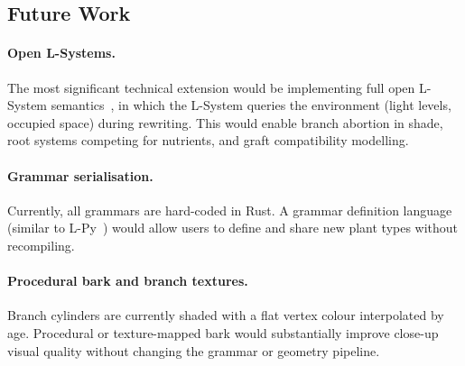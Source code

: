 \subsection{Future Work}

\paragraph{Open L-Systems.}
The most significant technical extension would be implementing full open L-System
semantics~\cite{mechVisualModelsPlants1996}, in which the L-System queries the environment (light levels,
occupied space) during rewriting. This would enable branch abortion in shade, root systems competing for
nutrients, and graft compatibility modelling.

\paragraph{Grammar serialisation.}
Currently, all grammars are hard-coded in Rust. A grammar definition language (similar to
L-Py~\cite{boudonLPyLSystemSimulation2012}) would allow users to define and share new plant types without recompiling.

\paragraph{Procedural bark and branch textures.}
Branch cylinders are currently shaded with a flat vertex colour interpolated by age. Procedural or
texture-mapped bark would substantially improve close-up visual quality without changing the grammar or
geometry pipeline.
